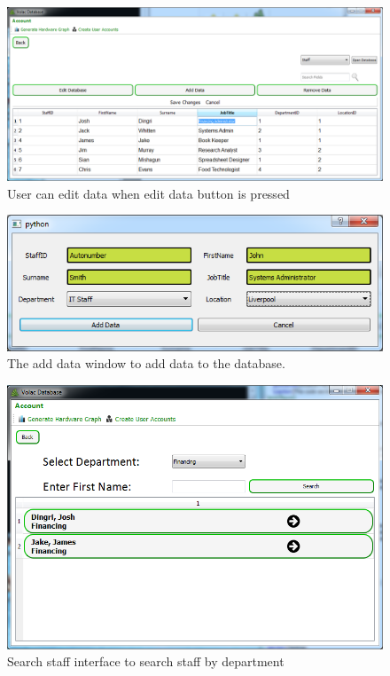 \begin{figure}[H]
    \includegraphics[width=\textwidth]{./Maintenance/Images/EditingData.png}
    \caption{User can edit data when edit data button is pressed} \label{fig:EditingData}
\end{figure}

\begin{figure}[H]
    \includegraphics[width=\textwidth]{./Maintenance/Images/AddingData.png}
    \caption{The add data window to add data to the database.} \label{fig:AddingData}
\end{figure}

\begin{figure}[H]
    \includegraphics[width=\textwidth]{./Maintenance/Images/searchstaff.png}
    \caption{Search staff interface to search staff by department} \label{fig:searchstaff}
\end{figure}

